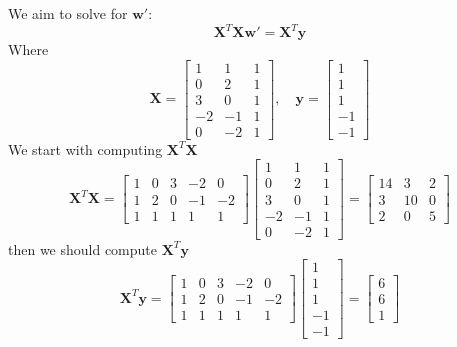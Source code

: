\documentclass[a4paper, 11pt]{article}
\begin{document}
	We aim to solve for $\mathbf{w}'$:
	\[
	 \mathbf{X}^T \mathbf{X} \mathbf{w}' =\mathbf{X}^T \mathbf{y}
	\]
	Where
	\[
	\mathbf{X} = 
	\begin{bmatrix}
		1 & 1 & 1 \\
		0 & 2 & 1 \\
		3 & 0 & 1 \\
		-2 & -1 & 1 \\
		0 & -2 & 1
	\end{bmatrix}, \quad
	\mathbf{y} = 
	\begin{bmatrix}
		1 \\
		1 \\
		1 \\
		-1 \\
		-1
	\end{bmatrix}
	\]
	We start with computing $\mathbf{X}^T \mathbf{X}$
	\[
	\mathbf{X}^T \mathbf{X} =
	\begin{bmatrix}
		1 & 0 & 3 & -2 & 0 \\
		1 & 2 & 0 & -1 & -2 \\
		1 & 1 & 1 & 1 & 1
	\end{bmatrix}
	\begin{bmatrix}
		1 & 1 & 1 \\
		0 & 2 & 1 \\
		3 & 0 & 1 \\
		-2 & -1 & 1 \\
		0 & -2 & 1
	\end{bmatrix}
	=
	\begin{bmatrix}
		14 & 3 & 2 \\
		3 & 10 & 0 \\
		2 & 0 & 5
	\end{bmatrix}
	\]
	then we should compute $\mathbf{X}^T \mathbf{y}$
	\[
	\mathbf{X}^T \mathbf{y} =
	\begin{bmatrix}
		1 & 0 & 3 & -2 & 0 \\
		1 & 2 & 0 & -1 & -2 \\
		1 & 1 & 1 & 1 & 1
	\end{bmatrix}
	\begin{bmatrix}
		1 \\
		1 \\
		1 \\
		-1 \\
		-1
	\end{bmatrix}
	=
	\begin{bmatrix}
		6 \\
		6 \\
		1
	\end{bmatrix}
	\]
\end{document}
